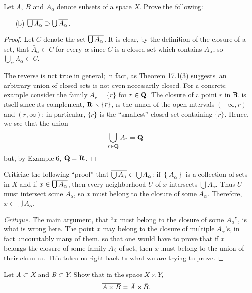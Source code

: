 \newpage
\begin{problem}[Munkres \S17, p.\,101, 6(c)]
Let $A$, $B$ and $A_\alpha$ denote subsets of a space $X$. Prove
the following:
\begin{enumerate}[noitemsep]
\item[(b)] $\overline{\bigcup A_\alpha}\supset\bigcup\overline{A_\alpha}$.
\end{enumerate}
\end{problem}
\begin{proof}
Let $C$ denote the set $\overline{\bigcup A_\alpha}$. It is clear, by
the definition of the closure of a set, that $\bar
A_\alpha\subset C$ for every $\alpha$ since $C$ is a closed set
which contains $A_\alpha$, so $\bigcup_\alpha \bar
A_\alpha\subset C$.

The reverse is not true in general; in fact, as Theorem 17.1(3)
suggests, an arbitrary union of closed sets is not even
necessarily closed. For a concrete example consider the family
$A_r=\{r\}$ for $r\in\mathbf{Q}$. The closure of a point $r$ in $\mathbf{R}$ is
itself since its complement, $\mathbf{R}\smallsetminus\{r\}$, is the
union of the open intervals $(-\infty,r)$ and $(r,\infty)$; in
particular, $\{r\}$ is the ``smallest'' closed set containing
$\{r\}$. Hence, we see that the union
\[
\bigcup_{r\in\mathbf{Q}}\bar A_r=\mathbf{Q},
\]
but, by Example 6, $\bar{\mathbf{Q}}=\mathbf{R}$.
\end{proof}
\newpage
\begin{problem}[Munkres \S17, p.\,101, 7]
Criticize the following ``proof'' that $\overline{\bigcup
  A_\alpha}\subset\bigcup\bar A_\alpha$: if
$\left\{A_\alpha\right\}$ is a collection of sets in $X$ and if
$x\in\overline{\bigcup A_\alpha}$, then every neighborhood $U$ of $x$
intersects $\bigcup A_\alpha$. Thus $U$ must intersect some
$A_\alpha$, so $x$ must belong to the closure of some
$A_\alpha$. Therefore, $x\in\bigcup\bar A_\alpha$.
\end{problem}
\begin{proof}[Critique]
The main argument, that ``$x$ must belong to the closure of some
$A_\alpha$'', is what is wrong here. The point $x$ may belong to
the closure of multiple $A_\alpha$'s, in fact uncountably many of
them, so that one would have to prove that if $x$ belongs the
closure of some family $A_\beta$ of set, then $x$ must belong to
the union of their closures. This takes us right back to what we
are trying to prove.
\end{proof}
\newpage
\begin{problem}[Munkres \S17, p.\,101, 9]
Let $A\subset X$ and $B\subset Y$. Show that in the space
$X\times Y$,
\[
\overline{A\times B}=\bar A\times\bar B.
\]
\end{problem}
